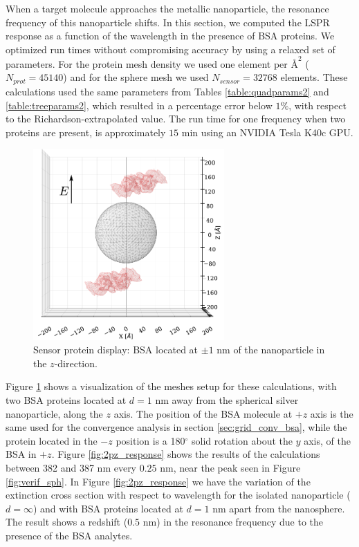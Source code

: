 When a target molecule approaches the metallic nanoparticle, the resonance frequency
of this nanoparticle shifts. In this section, we computed the LSPR response as a
function of the wavelength in the presence of BSA proteins. We optimized run times 
without compromising accuracy by using a relaxed set of parameters. For the protein
mesh density we used one element per $\text{\AA}^2$ ($N_{prot} = 45140$) and for the
sphere mesh we used $N_{sensor} = 32768$ elements. These calculations used the same
parameters from Tables \ref{table:quadparams2} and \ref{table:treeparams2}, which 
resulted in a percentage error below $1\%$, with respect to the Richardson-extrapolated
value. The run time for one frequency when two proteins are present, is approximately 
$15$ min using an NVIDIA Tesla K40c GPU.

\begin{figure}[h] %
    \centering
    \includegraphics[width=0.65\textwidth]{2prot_1nm_z_R8nm.pdf} 
    \caption{Sensor protein display: BSA located at $\pm 1$ nm of the 
            nanoparticle in the $z$-direction.}
    \label{fig:display_z}
\end{figure}

Figure \ref{fig:display_z} shows a visualization of the meshes setup for these 
calculations, with two BSA proteins located at $d=1$ nm away from the spherical 
silver nanoparticle, along the $z$ axis. The position of the BSA molecule at $+z$ 
axis is the same used for the convergence analysis in section \ref{sec:grid_conv_bsa},
while the protein located in the $-z$ position is a 180$^\circ$ solid rotation 
about the $y$ axis, of the BSA in $+z$.  Figure \ref{fig:2pz_response} shows the results
of the calculations between 382 and 387 nm every $0.25$ nm, near the peak seen in Figure
\ref{fig:verif_sph}. In Figure \ref{fig:2pz_response} we have the variation of the 
extinction cross section with respect to wavelength for the isolated nanoparticle 
($d=\infty$) and with BSA proteins located at $d=1$ nm apart from the nanosphere. The
result shows a redshift ($0.5$ nm) in the resonance frequency due to the presence of 
the BSA analytes.

